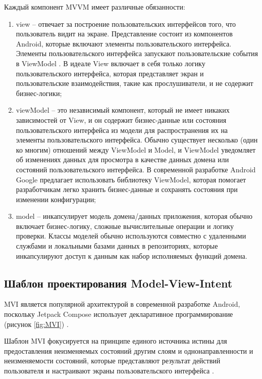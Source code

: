 Каждый компонент MVVM имеет различные обязанности:

\begin{enumerate}
    \item view -- отвечает за построение пользовательских интерфейсов того, что пользователь видит на экране. Представление состоит из компонентов Android, которые включают элементы пользовательского интерфейса. Элементы пользовательского интерфейса запускают пользовательские события в ViewModel \cite{book:22}. В идеале View включает в себя только логику пользовательского интерфейса, которая представляет экран и пользовательские взаимодействия, такие как прослушиватели, и не содержит бизнес-логики;
    \item viewModel -- это независимый компонент, который не имеет никаких зависимостей от View, и он содержит бизнес-данные или состояния пользовательского интерфейса из модели для распространения их на элементы пользовательского интерфейса. Обычно существует несколько (один ко многим) отношений между ViewModel и Model, и ViewModel уведомляет об изменениях данных для просмотра в качестве данных домена или состояний пользовательского интерфейса. В современной разработке Android Google предлагает использовать библиотеку ViewModel, которая помогает разработчикам легко хранить бизнес-данные и сохранять состояния при изменении конфигурации;
    \item model -- инкапсулирует модель домена/данных приложения, которая обычно включает бизнес-логику, сложные вычислительные операции и логику проверки. Классы моделей обычно используются совместно с удаленными службами и локальными базами данных в репозиториях, которые инкапсулируют доступ к данным как набор исполняемых функций домена.
\end{enumerate}



\subsection{Шаблон проектирования Model-View-Intent}

MVI является популярной архитектурой в современной разработке Android, поскольку Jetpack Compose использует декларативное программирование (рисунок \ref{fig:MVI}) \cite{jetpack1}.

Шаблон MVI фокусируется на принципе единого источника истины для предоставления неизменяемых состояний другим слоям и однонаправленности и неизменяемости состояний, которые представляют результат действий пользователя и настраивают экраны пользовательского интерфейса \cite{book:23}.

